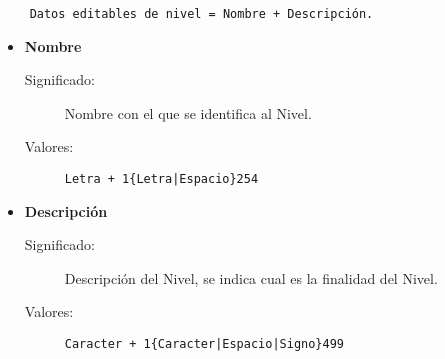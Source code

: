 \begin{lstlisting}
	Datos editables de nivel = Nombre + Descripción.
\end{lstlisting}
\begin{itemize}
	\item \textbf{Nombre}
		\begin{description}
			\item [Significado:] Nombre con el que se identifica al Nivel.
			\item [Valores:]{\begin{lstlisting}
Letra + 1{Letra|Espacio}254\end{lstlisting}}
		\end{description}
\item	\textbf{Descripción}
		\begin{description}
			\item [Significado:] Descripción del Nivel, se indica cual es la finalidad del Nivel.
			\item [Valores:]{\begin{lstlisting}		             
Caracter + 1{Caracter|Espacio|Signo}499\end{lstlisting}}

		\end{description}
\end{itemize}


